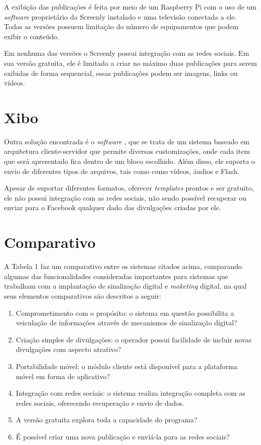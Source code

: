 A exibição das publicações é feita por meio de um Raspberry Pi com o uso de um \textit{software} proprietário da Screenly instalado e uma televisão conectada a ele. Todas as versões possuem limitação do número de equipamentos que podem exibir o conteúdo.

Em nenhuma das versões o Screenly possui integração com as redes sociais. Em sua versão gratuita, ele é limitado a criar no máximo duas publicações para serem exibidas de forma sequencial, essas publicações podem ser imagens, links ou vídeos.

\section{Xibo}
Outra solução encontrada é o \textit{software} \citet{xibo2017}, que se trata de um sistema baseado em arquitetura cliente-servidor que permite diversas customizações, onde cada item que será apresentado fica dentro de um bloco escolhido. Além disso, ele suporta o envio de diferentes tipos de arquivos, tais como como vídeos, áudios e Flash.

Apesar de suportar diferentes formatos, oferecer \textit{templates} prontos e ser gratuito, ele não possui integração com as redes sociais, não sendo possível recuperar ou enviar para o Facebook qualquer dado das divulgações criadas por ele. 

\section{Comparativo}
A Tabela 1 faz um comparativo entre os sistemas citados acima, comparando algumas das funcionalidades consideradas importantes para sistemas que trabalham com a implantação de sinalização digital e \textit{maketing} digital, na qual seus elementos comparativos são descritos a seguir:
\begin{enumerate}[label=\Roman*)]
	\item Comprometimento com o propósito: o sistema em questão possibilita a veiculação de informações através de mecanismos de sinalização digital?
	\item Criação simples de divulgações: o operador possui facilidade de incluir novas divulgações com aspecto atrativo?
	\item Portabilidade móvel: o módulo cliente está disponível para a plataforma móvel em forma de aplicativo?
	\item Integração com redes sociais: o sistema realiza integração completa com as redes sociais, oferecendo recuperação e envio de dados.
	\item A versão gratuita explora toda a capacidade do programa?
	\item É possível criar uma nova publicação e enviá-la para as redes sociais?
\end{enumerate}

